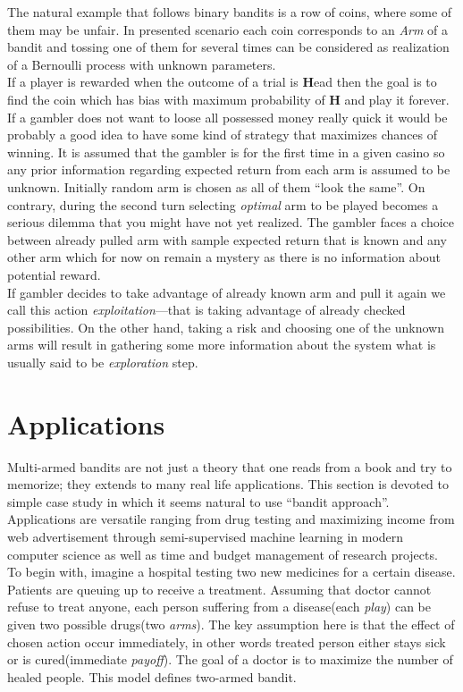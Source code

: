 \documentclass[12pt, a4paper, pdflatex, leqno]{report}
\begin{document}
The natural example that follows binary bandits is a row of coins, where some of them may be unfair. In presented scenario each coin corresponds to an \emph{Arm} of a bandit and tossing one of them for several times can be considered as realization of a Bernoulli process with unknown parameters.\\
If a player is rewarded when the outcome of a trial is \textbf{H}ead then the goal is to find the coin which has bias with maximum probability of \textbf{H} and play it forever.\\

If a gambler does not want to loose all possessed money really quick it would be probably a good idea to have some kind of strategy that maximizes chances of winning. It is assumed that the gambler is for the first time in a given casino so any prior information regarding expected return from each arm is assumed to be unknown. Initially random arm is chosen as all of them ``look the same''. On contrary, during the second turn selecting \emph{optimal} arm to be played becomes a serious dilemma that you might have not yet realized. The gambler faces a choice between already pulled arm with sample expected return that is known and any other arm which for now on remain a mystery as there is no information about potential reward.\\
If gambler decides to take advantage of already known arm and pull it again we call this action \emph{exploitation}---that is taking advantage of already checked possibilities. On the other hand, taking a risk and choosing one of the unknown arms will result in gathering some more information about the system what is usually said to be \emph{exploration} step.\\


\section{Applications} %
Multi-armed bandits are not just a theory that one reads from a book and try to memorize; they extends to many real life applications. This section is devoted to simple case study in which it seems natural to use ``bandit approach''. Applications are versatile ranging from drug testing and maximizing income from web advertisement through semi-supervised machine learning in modern computer science as well as time and budget management of research projects.\\

To begin with, imagine a hospital testing two new medicines for a certain disease. Patients are queuing up to receive a treatment. Assuming that doctor cannot refuse to treat anyone, each person suffering from a disease(each \emph{play}) can be given two possible drugs(two \emph{arms}). The key assumption here is that the effect of chosen action occur immediately, in other words treated person either stays sick or is cured(immediate \emph{payoff}). The goal of a doctor is to maximize the number of healed people. This model defines two-armed bandit.\\
\end{document}
